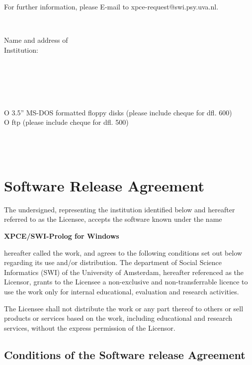 For further information, please E-mail to xpce-request@swi.psy.uva.nl.

\newlength{\tag}
\settowidth{\tag}{Authorised Signature: }
\newlength{\rest}
\setlength{\rest}{\textwidth}
\addtolength{\rest}{-\tag}

\newcommand{\fillin}{\dotfill\mbox{}}
\newcommand{\onlydots}{\mbox{}\fillin}
\def\next{\\[2mm]}

\vspace{0.5cm}
\fillin \next
\parbox[t]{\tag}{Name and address of \\ Institution:}%
\parbox[t]{\rest}{\onlydots \next \onlydots \next \onlydots} \next
{}\fillin \next
{}O 3.5'' MS-DOS formatted floppy disks (please include cheque for dfl. 600) \\
\makebox[\tag][l]{\mbox{}}O ftp (please include cheque for dfl. 500) \next
{}\fillin \next
{}\fillin \next
{}\fillin \\


\section*{Software Release Agreement}

The undersigned, representing the institution identified below and
hereafter referred to as the Licensee, accepts the software known under
the name

\vspace{2mm}
\centerline{\bf XPCE/SWI-Prolog for Windows}
\vspace{2mm}

hereafter called the work, and agrees to the following conditions set
out below regarding its use and/or distribution.  The department of
Social Science Informatics (SWI) of the University of Amsterdam,
hereafter referenced as the Licensor, grants to the Licensee a
non-exclusive and non-transferrable licence to use the work only for
internal educational, evaluation and research activities.

The Licensee shall not distribute the work or any part thereof to others
or sell products or services based on the work, including educational
and research services, without the express permission of the Licensor.

\subsection*{Conditions of the Software release Agreement}


